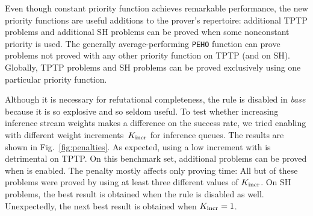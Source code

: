 \documentclass[smallcondensed,draft]{svjour3}     %
\begin{document}
Even though constant priority function achieves remarkable performance, the new priority functions are
useful additions to the prover's repertoire:  additional
TPTP problems and  additional SH problems can be proved when some
nonconstant priority is used. The generally average-performing \verb|PEHO|
function can prove  problems not proved with any other priority function on TPTP
(and  on SH). Globally,  TPTP problems and  SH problems
can be proved exclusively using one particular priority function.






Although it is necessary for refutational completeness, the 
rule is disabled in \emph{base} because it is so explosive and so seldom useful.
To test whether increasing inference stream weights makes a difference on the
success rate, we tried enabling  with different weight
increments~$K_\mathrm{incr}$ for  inference queues. The
results are shown in Fig.~\ref{fig:penalties}. As expected, using a low
increment with  is detrimental on TPTP. On this
benchmark set,  additional problems can be proved when
 is enabled. The penalty mostly affects only proving time: All
but  of these problems were proved by using at least three different
values of $K_\mathrm{incr}$. On SH problems, the best result is obtained
when the rule is disabled as well. Unexpectedly, the next best result is obtained when
$K_\mathrm{incr}=1$.
\end{document}
